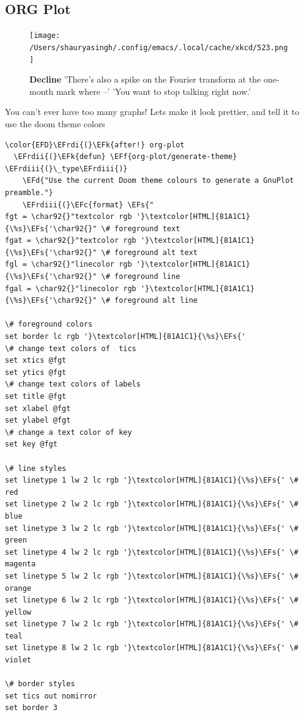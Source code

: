 \documentclass{scrartcl}
\newcommand{\EFk}[1]{\textcolor{EFk}{#1}} %
\newcommand{\EFd}[1]{\textcolor{EFd}{#1}} %
\newcommand{\EFs}[1]{\textcolor{EFs}{#1}} %
\newcommand{\EFc}[1]{\textcolor{EFc}{#1}} %
\newcommand{\EFf}[1]{\textcolor{EFf}{#1}} %
\newcommand{\EFrdi}[1]{#1} %
\newcommand{\EFrdii}[1]{#1} %
\newcommand{\EFrdiii}[1]{#1} %
\begin{document}
\subsection{ORG Plot}
\label{sec:orgec2b4ae}

\begin{figure}[!htb]
	  \centering
	  \texttt{[image: /Users/shauryasingh/.config/emacs/.local/cache/xkcd/523.png]}
  \caption*{\label{xkcd:523} \textbf{Decline} 'There's also a spike on the Fourier transform at the one-month mark where --' 'You want to stop talking right now.'}
	\end{figure}

You can't ever have too many graphs! Lets make it look prettier, and tell it to use the doom theme colors
\begin{Code}
\begin{Verbatim}[]
\color{EFD}\EFrdi{(}\EFk{after!} org-plot
  \EFrdii{(}\EFk{defun} \EFf{org-plot/generate-theme} \EFrdiii{(}\_type\EFrdiii{)}
    \EFd{"Use the current Doom theme colours to generate a GnuPlot preamble."}
    \EFrdiii{(}\EFc{format} \EFs{"
fgt = \char92{}"textcolor rgb '}\textcolor[HTML]{81A1C1}{\%s}\EFs{'\char92{}" \# foreground text
fgat = \char92{}"textcolor rgb '}\textcolor[HTML]{81A1C1}{\%s}\EFs{'\char92{}" \# foreground alt text
fgl = \char92{}"linecolor rgb '}\textcolor[HTML]{81A1C1}{\%s}\EFs{'\char92{}" \# foreground line
fgal = \char92{}"linecolor rgb '}\textcolor[HTML]{81A1C1}{\%s}\EFs{'\char92{}" \# foreground alt line

\# foreground colors
set border lc rgb '}\textcolor[HTML]{81A1C1}{\%s}\EFs{'
\# change text colors of  tics
set xtics @fgt
set ytics @fgt
\# change text colors of labels
set title @fgt
set xlabel @fgt
set ylabel @fgt
\# change a text color of key
set key @fgt

\# line styles
set linetype 1 lw 2 lc rgb '}\textcolor[HTML]{81A1C1}{\%s}\EFs{' \# red
set linetype 2 lw 2 lc rgb '}\textcolor[HTML]{81A1C1}{\%s}\EFs{' \# blue
set linetype 3 lw 2 lc rgb '}\textcolor[HTML]{81A1C1}{\%s}\EFs{' \# green
set linetype 4 lw 2 lc rgb '}\textcolor[HTML]{81A1C1}{\%s}\EFs{' \# magenta
set linetype 5 lw 2 lc rgb '}\textcolor[HTML]{81A1C1}{\%s}\EFs{' \# orange
set linetype 6 lw 2 lc rgb '}\textcolor[HTML]{81A1C1}{\%s}\EFs{' \# yellow
set linetype 7 lw 2 lc rgb '}\textcolor[HTML]{81A1C1}{\%s}\EFs{' \# teal
set linetype 8 lw 2 lc rgb '}\textcolor[HTML]{81A1C1}{\%s}\EFs{' \# violet

\# border styles
set tics out nomirror
set border 3


\end{Verbatim}
\end{Code}
\end{document}
